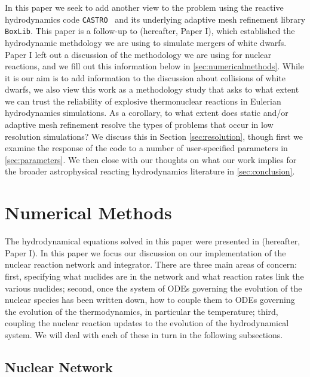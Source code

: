 \documentclass[twocolumn,numberedappendix]{../aastex6}
\newcommand{\boxlib}{\texttt{BoxLib}}
\newcommand{\castro}{\texttt{CASTRO}}
\begin{document}
In this paper we seek to add another view to the problem using the reactive hydrodynamics
code \castro\ \citep{castro} and its underlying adaptive mesh refinement library \boxlib.
This paper is a follow-up to \citet{wdmergerI} (hereafter, Paper I), which established
the hydrodynamic methdology we are using to simulate mergers of white dwarfs.
Paper I left out a discussion of the methodology we are using for nuclear reactions,
and we fill out this information below in \autoref{sec:numericalmethods}. While it is
our aim is to add information to the discussion about collisions of white dwarfs,
we also view this work as a methodology study that asks to what extent we
can trust the reliability of explosive thermonuclear reactions in Eulerian
hydrodynamics simulations. As a corollary, to what extent does static and/or
adaptive mesh refinement resolve the types of problems that occur in low resolution
simulations? We discuss this in Section \autoref{sec:resolution}, though first
we examine the response of the code to a number of user-specified parameters in
\autoref{sec:parameters}. We then close with our thoughts on what our work implies
for the broader astrophysical reacting hydrodynamics literature in \autoref{sec:conclusion}.



\section{Numerical Methods}
\label{sec:numericalmethods}

The hydrodynamical equations solved in this paper were presented in \citet{wdmergerI} (hereafter, Paper I).
In this paper we focus our discussion on our implementation of the nuclear
reaction network and integrator. There are three main areas of concern: first,
specifying what nuclides are in the network and what reaction rates link the
various nuclides; second, once the system of ODEs governing the evolution of
the nuclear species has been written down, how to couple them to ODEs governing
the evolution of the thermodynamics, in particular the temperature; third,
coupling the nuclear reaction updates to the evolution of the hydrodynamical
system. We will deal with each of these in turn in the following subsections.

\subsection{Nuclear Network}
\label{sec:network}
\end{document}
